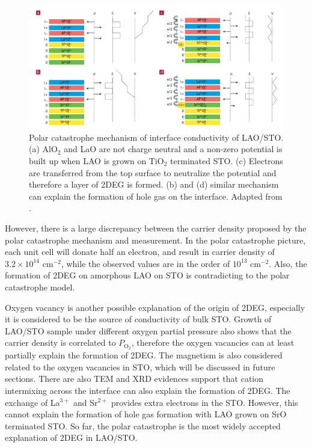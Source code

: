 \documentclass[pdflatex, sectionletters, 12pt]{pittetd}    %
\begin{document}
\begin{figure}[h!]
	\centering
	\includegraphics[width=1.0\textwidth]{Drawing/PolarCatastrophe.pdf}
	\caption{Polar catastrophe mechanism of interface conductivity of LAO/STO. (a) AlO$_2$ and LaO are not charge neutral and a non-zero potential is built up when LAO is grown on TiO$_2$ terminated STO. (c) Electrons are transferred from the top surface to neutralize the potential and therefore a layer of 2DEG is formed. (b) and (d) similar mechanism can explain the formation of hole gas on the interface. Adapted from \cite{nakagawa2006some}.}
	\label{FIG:PolarCatastrophe}
\end{figure}

However, there is a large discrepancy between the carrier density proposed by the polar catastrophe mechanism and measurement. In the polar catastrophe picture, each unit cell will donate half an electron, and result in carrier density of $3.2 \times 10^{14}$ cm$^{-2}$, while the observed values are in the order of $10^{13}$ cm$^{-2}$. Also, the formation of 2DEG on amorphous LAO on STO is contradicting to the polar catastrophe model. 

Oxygen vacancy is another possible explanation of the origin of 2DEG\cite{kalabukhov2007effect}, especially it is considered to be the source of conductivity of bulk STO\cite{schooley1965dependence}. Growth of LAO/STO sample under different oxygen partial pressure also shows that the carrier density is correlated to $P_{\mathrm{O_2}}$, therefore the oxygen vacancies can at least partially explain the formation of 2DEG. The magnetism is also considered related to the oxygen vacancies in STO, which will be discussed in future sections. There are also TEM\cite{nakagawa2006some} and XRD\cite{willmott2007structural} evidences support that cation intermixing across the interface can also explain the formation of 2DEG. The exchange of La$^{3+}$ and Sr$^{2+}$ provides extra electrons in the STO. However, this cannot explain the formation of hole gas formation with LAO grown on SrO terminated STO. So far, the polar catastrophe is the most widely accepted explanation of 2DEG in LAO/STO.
\end{document}
